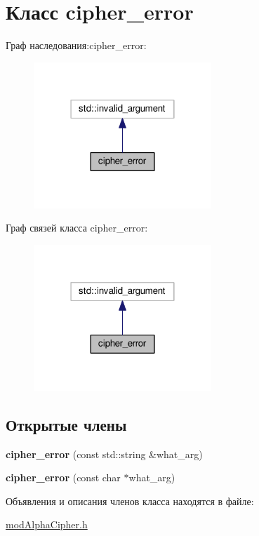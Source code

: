 \hypertarget{classcipher__error}{}\section{Класс cipher\+\_\+error}
\label{classcipher__error}


Граф наследования\+:cipher\+\_\+error\+:\nopagebreak
\begin{figure}[H]
\begin{center}
\leavevmode
\includegraphics[width=190pt]{classcipher__error__inherit__graph}
\end{center}
\end{figure}


Граф связей класса cipher\+\_\+error\+:\nopagebreak
\begin{figure}[H]
\begin{center}
\leavevmode
\includegraphics[width=190pt]{classcipher__error__coll__graph}
\end{center}
\end{figure}
\subsection*{Открытые члены}
\begin{DoxyCompactItemize}
\item 
\mbox{\label{classcipher__error_aac662e216a84bfeb873303c7b88d029e}} 
{\bfseries cipher\+\_\+error} (const std\+::string \&what\+\_\+arg)
\item 
\mbox{\label{classcipher__error_a18cf27d9c2cd2538d3cb8f17e9a55f3e}} 
{\bfseries cipher\+\_\+error} (const char $\ast$what\+\_\+arg)
\end{DoxyCompactItemize}


Объявления и описания членов класса находятся в файле\+:\begin{DoxyCompactItemize}
\item 
\hyperlink{modAlphaCipher_8h}{mod\+Alpha\+Cipher.\+h}\end{DoxyCompactItemize}
